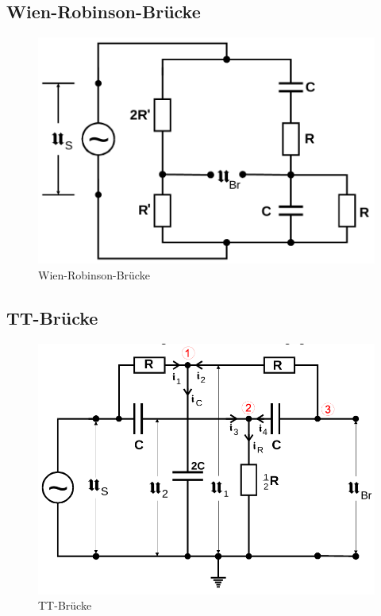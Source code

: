 \subsection{Wien-Robinson-Brücke}             
\label{sec:wien-robinson}

\begin{figure}[H]
    \centering
    \includegraphics[scale=0.4]{pictures/6-wien-robinson.png}
    \caption{Wien-Robinson-Brücke}
    \label{fig:wien-robinson}
\end{figure}

\subsection{TT-Brücke}                       
\label{sec:TT}

\begin{figure}[H]
    \centering
    \includegraphics[scale=0.4]{pictures/7-TT.png}
    \caption{TT-Brücke}
    \label{fig:TT}
\end{figure}
